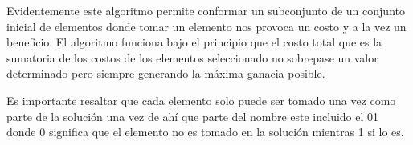 Evidentemente este algoritmo permite conformar un subconjunto de un conjunto inicial de elementos donde tomar un elemento nos provoca un costo y a la vez un beneficio. El algoritmo funciona bajo el principio que el costo total que es la sumatoria de los costos de los elementos seleccionado no sobrepase un valor determinado pero siempre generando la máxima ganacia posible.

Es importante resaltar que cada elemento solo puede ser tomado una vez como parte de la solución una vez de ahí que parte del nombre este incluido el 01 donde 0 significa que el elemento no es tomado en la solución mientras 1 si lo es. 